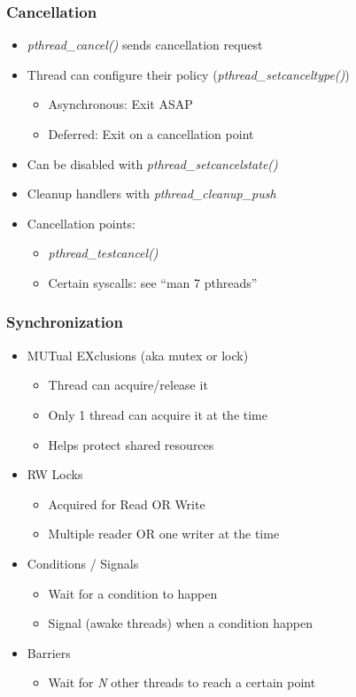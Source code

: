 \begin{frame}
  \frametitle{Cancellation}

  \begin{itemize}
  \item \emph{pthread\_cancel()} sends cancellation request
  \item Thread can configure their policy (\emph{pthread\_setcanceltype()})
    \begin{itemize}
    \item Asynchronous: Exit ASAP
    \item Deferred: Exit on a cancellation point
    \end{itemize}
  \item Can be disabled with \emph{pthread\_setcancelstate()}
  \item Cleanup handlers with \emph{pthread\_cleanup\_push}
  \item Cancellation points:
    \begin{itemize}
    \item \emph{pthread\_testcancel()}
    \item Certain syscalls: see ``man 7 pthreads''
    \end{itemize}
  \end{itemize}
\end{frame}





\begin{frame}
  \frametitle{Synchronization}

  \begin{itemize}
  \item MUTual EXclusions (aka mutex or lock)
    \begin{itemize}
    \item Thread can acquire/release it
    \item Only 1 thread can acquire it at the time
    \item Helps protect shared resources
    \end{itemize}
  \item RW Locks
    \begin{itemize}
    \item Acquired for Read OR Write
    \item Multiple reader OR one writer at the time
    \end{itemize}
  \item Conditions / Signals
    \begin{itemize}
    \item Wait for a condition to happen
    \item Signal (awake threads) when a condition happen
    \end{itemize}
  \item Barriers
    \begin{itemize}
    \item Wait for \emph{N} other threads to reach a certain point
    \end{itemize}
  \end{itemize}

\end{frame}


